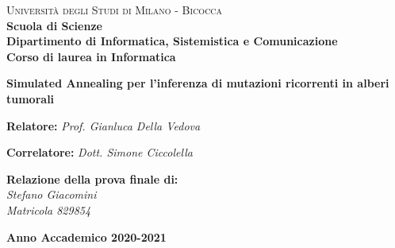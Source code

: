 \documentclass[12pt]{report}
\begin{document}
\captionsetup[table]{name=Figura}

\begin{titlepage}


  \noindent
  \begin{minipage}[t]{0.19\textwidth}
  \end{minipage}
  \begin{minipage}[t]{0.81\textwidth}
    {
      {\textsc{Università degli Studi di Milano - Bicocca}}\\
      \textbf{Scuola di Scienze}\\
      \textbf{Dipartimento di Informatica, Sistemistica e Comunicazione}\\
      \textbf{Corso di laurea in Informatica}\\
      \par
    }
  \end{minipage}

  \vspace{30mm}

  \begin{center}
    {\LARGE{
        \textbf{Simulated Annealing per l'inferenza di mutazioni ricorrenti in alberi tumorali}}}
  \end{center}

  \vspace{40mm}

  \noindent
  {\large \textbf{Relatore:} \textit{Prof. Gianluca Della Vedova} }

  \noindent
  {\large \textbf{Correlatore:} \textit{Dott. Simone Ciccolella}}

  \vspace{50mm}

  \begin{flushright}
    \textbf{\large Relazione della prova finale di:\\}
    \large{\textit{Stefano Giacomini}}\\
    \large{\textit{Matricola 829854}}
  \end{flushright}

  \vspace{15mm}
  \begin{center}
    {\large{\bf Anno Accademico 2020-2021}}
  \end{center}

  \restoregeometry

\end{titlepage}
\restoregeometry
\end{document}
